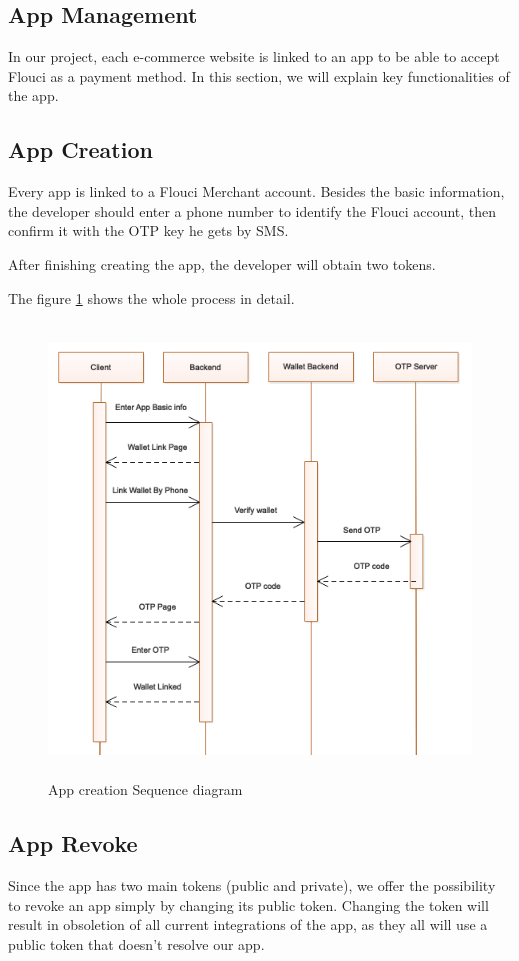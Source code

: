 \begin{spacing}{1.2}
\section{App Management}
In our project, each e-commerce website is linked to an app to be able to accept Flouci as a payment method.
In this section, we will explain key functionalities of the app.
\subsection{App Creation}
Every app is linked to a Flouci Merchant account. Besides the basic information, the developer should enter a phone number to identify the Flouci account, then confirm it with the OTP key he gets by SMS.

After finishing creating the app, the developer will obtain two tokens.

The figure \ref{fig:appcreate} shows the whole process in detail.
\begin{figure}[H]\centering
\includegraphics[width=\textwidth,height=12cm]{Create_App_Sequence_Diagram.png}
\caption{App creation Sequence diagram}
\label{fig:appcreate}
\end{figure}
\subsection{App Revoke}
Since the app has two main tokens (public and private), we offer the possibility to revoke an app simply by changing its public token. Changing the token will result in obsoletion of all current integrations of the app, as they all will use a public token that doesn't resolve our app.


\end{spacing}

